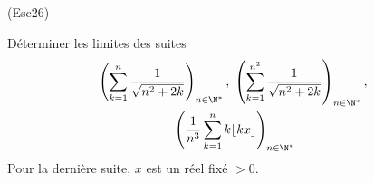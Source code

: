 \begin{tiny}(Esc26)\end{tiny} Déterminer les limites des suites 
\begin{multline*}
 \left( \sum_{k=1}^{n}\frac{1}{\sqrt{n^2+2k}}\right) _{n\in \N^*},\;
 \left( \sum_{k=1}^{n^2}\frac{1}{\sqrt{n^2+2k}}\right) _{n\in \N^*},\; \\
 \left( \frac{1}{n^3}\sum_{k=1}^{n}k\lfloor kx \rfloor\right) _{n\in \N^*}
\end{multline*}
Pour la dernière suite, $x$ est un réel fixé $>0$. 